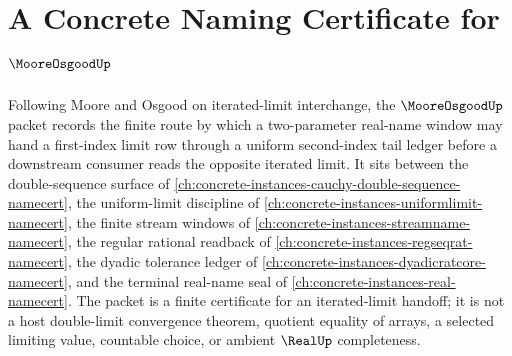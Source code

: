 \chapter{A Concrete Naming Certificate for $\MooreOsgoodUp$}
\label{ch:concrete-instances-moore-osgood-namecert}

Following Moore and Osgood on iterated-limit interchange, the $\MooreOsgoodUp$ packet records the finite route by which a two-parameter real-name window may hand a first-index limit row through a uniform second-index tail ledger before a downstream consumer reads the opposite iterated limit. It sits between the double-sequence surface of \autoref{ch:concrete-instances-cauchy-double-sequence-namecert}, the uniform-limit discipline of \autoref{ch:concrete-instances-uniformlimit-namecert}, the finite stream windows of \autoref{ch:concrete-instances-streamname-namecert}, the regular rational readback of \autoref{ch:concrete-instances-regseqrat-namecert}, the dyadic tolerance ledger of \autoref{ch:concrete-instances-dyadicratcore-namecert}, and the terminal real-name seal of \autoref{ch:concrete-instances-real-namecert}. The packet is a finite certificate for an iterated-limit handoff; it is not a host double-limit convergence theorem, quotient equality of arrays, a selected limiting value, countable choice, or ambient $\RealUp$ completeness.

